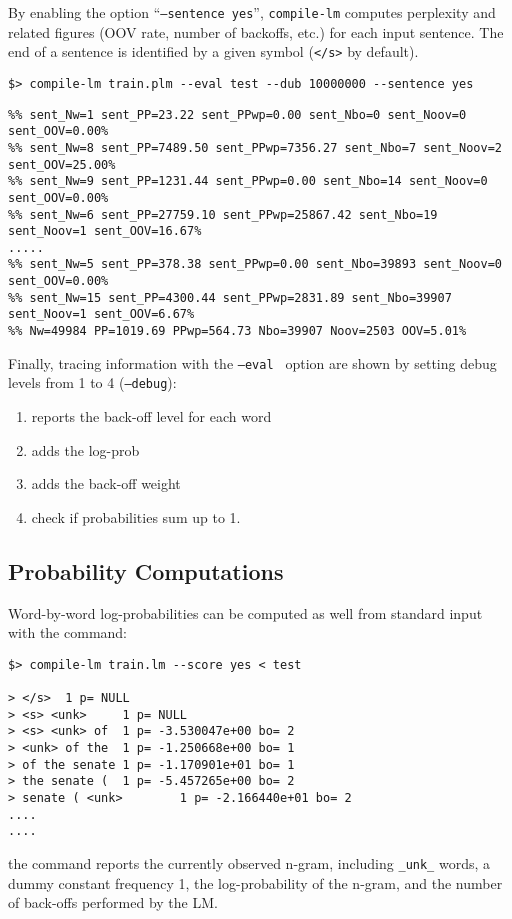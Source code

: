 \documentclass[11pt]{article}
\begin{document}
\bigskip
\noindent
By enabling the option ``{\tt --sentence yes}'', {\tt compile-lm} computes perplexity and related figures (OOV rate, number of backoffs, etc.) for each input sentence. The end of a sentence is identified by a given symbol ({\tt </s>} by default).
\begin{verbatim}
$> compile-lm train.plm --eval test --dub 10000000 --sentence yes	
\end{verbatim}
{\small 
\begin{verbatim}
%% sent_Nw=1 sent_PP=23.22 sent_PPwp=0.00 sent_Nbo=0 sent_Noov=0 sent_OOV=0.00%
%% sent_Nw=8 sent_PP=7489.50 sent_PPwp=7356.27 sent_Nbo=7 sent_Noov=2 sent_OOV=25.00%
%% sent_Nw=9 sent_PP=1231.44 sent_PPwp=0.00 sent_Nbo=14 sent_Noov=0 sent_OOV=0.00%
%% sent_Nw=6 sent_PP=27759.10 sent_PPwp=25867.42 sent_Nbo=19 sent_Noov=1 sent_OOV=16.67%
.....
%% sent_Nw=5 sent_PP=378.38 sent_PPwp=0.00 sent_Nbo=39893 sent_Noov=0 sent_OOV=0.00%
%% sent_Nw=15 sent_PP=4300.44 sent_PPwp=2831.89 sent_Nbo=39907 sent_Noov=1 sent_OOV=6.67%
%% Nw=49984 PP=1019.69 PPwp=564.73 Nbo=39907 Noov=2503 OOV=5.01%
\end{verbatim}
}

\bigskip
\noindent
Finally, tracing information with the {\tt --eval }  option are shown by setting 
debug levels from 1 to 4 ({\tt --debug}):
\begin{enumerate}
\item reports the back-off level for each word
\item adds the log-prob 
\item adds the back-off weight
\item check if probabilities sum up to 1.
\end{enumerate}


\subsection{Probability Computations}
Word-by-word log-probabilities  can be computed as well from standard input with the command:
\begin{verbatim}
$> compile-lm train.lm --score yes < test

> </s>  1 p= NULL
> <s> <unk>     1 p= NULL
> <s> <unk> of  1 p= -3.530047e+00 bo= 2
> <unk> of the  1 p= -1.250668e+00 bo= 1
> of the senate 1 p= -1.170901e+01 bo= 1
> the senate (  1 p= -5.457265e+00 bo= 2
> senate ( <unk>        1 p= -2.166440e+01 bo= 2
....
....
\end{verbatim}

\noindent
the command reports the currently observed n-gram, 
including {\tt\_unk\_} words, a dummy
constant frequency 1, the log-probability of the n-gram, and the 
number of back-offs performed by the LM.  
\end{document}
